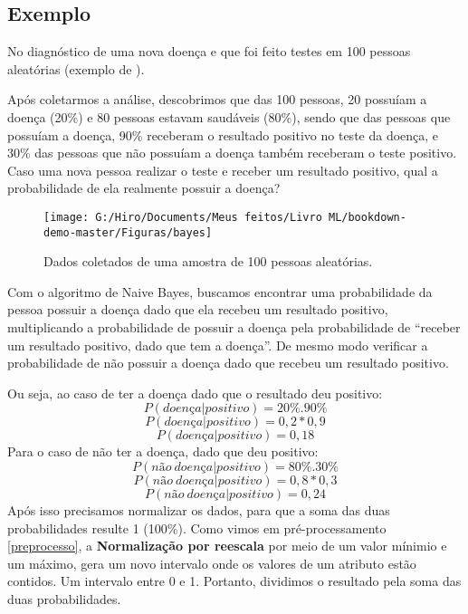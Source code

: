 \documentclass[
]{book}
\begin{document}
\hypertarget{exbayes}{%
\subsection{Exemplo}\label{exbayes}}

No diagnóstico de uma nova doença e que foi feito testes em 100 pessoas aleatórias (exemplo de \citet{organica}).

Após coletarmos a análise, descobrimos que das 100 pessoas, 20 possuíam a doença (20\%) e 80 pessoas estavam saudáveis (80\%), sendo que das pessoas que possuíam a doença, 90\% receberam o resultado positivo no teste da doença, e 30\% das pessoas que não possuíam a doença também receberam o teste positivo. Caso uma nova pessoa realizar o teste e receber um resultado positivo, qual a probabilidade de ela realmente possuir a doença?

\begin{figure}

{\centering \texttt{[image: G:/Hiro/Documents/Meus feitos/Livro ML/bookdown-demo-master/Figuras/bayes]} 

}

\caption{Dados coletados de uma amostra de 100 pessoas aleatórias.}\label{fig:bayes}
\end{figure}



Com o algoritmo de Naive Bayes, buscamos encontrar uma probabilidade da pessoa possuir a doença dado que ela recebeu um resultado positivo, multiplicando a probabilidade de possuir a doença pela probabilidade de ``receber um resultado positivo, dado que tem a doença''. De mesmo modo verificar a probabilidade de não possuir a doença dado que recebeu um resultado positivo.

Ou seja, ao caso de ter a doença dado que o resultado deu positivo:
\[P(doença|positivo) = 20\% . 90\% \] \[P(doença|positivo) = 0,2 * 0,9 \] \[P(doença|positivo) = 0,18\]
Para o caso de não ter a doença, dado que deu positivo:
\[P(não \ doença|positivo) = 80\%.30\%\]
\[P(não \ doença|positivo) = 0,8 * 0,3\]
\[P(não\ doença|positivo) = 0,24\]
Após isso precisamos normalizar os dados, para que a soma das duas probabilidades resulte 1 (100\%). Como vimos em pré-processamento \ref{preprocesso}, a \textbf{Normalização por reescala} por meio de um valor mínimio e um máximo, gera um novo intervalo onde os valores de um atributo estão contidos. Um intervalo entre 0 e 1. Portanto, dividimos o resultado pela soma das duas probabilidades.
\end{document}
